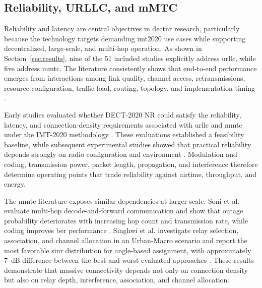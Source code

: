 \subsection{Reliability, URLLC, and mMTC}
\label{subsec:reliability}

Reliability and latency are central objectives in \gls{dectnr} research, particularly because the technology targets demanding \gls{imt2020} use cases while supporting decentralized, large-scale, and multi-hop operation. As shown in Section~\ref{sec:results}, nine of the 51 included studies explicitly address \gls{urllc}, while five address \gls{mmtc}. The literature consistently shows that end-to-end performance emerges from interactions among link quality, channel access, retransmissions, resource configuration, traffic load, routing, topology, and implementation timing \cite{maliatsosEvaluationIMT2020Candidate2022a, smidaETSIDECT2020Component2023, samuylovEmpoweringNearURLLCIoT2025}.

Early studies evaluated whether DECT-2020 NR could satisfy the reliability, latency, and connection-density requirements associated with \gls{urllc} and \gls{mmtc} under the IMT-2020 methodology \cite{maliatsosEvaluationIMT2020Candidate2022a, smidaETSIDECT2020Component2023, pennerURLLCPerformanceEvaluation2021}. These evaluations established a feasibility baseline, while subsequent experimental studies showed that practical reliability depends strongly on radio configuration and environment \cite{haqueDECT2020NRLink2025, bandaraExperimentalValidationAnalysis2025, grafParetoOptimalityApproach2026a}. Modulation and coding, transmission power, packet length, propagation, and interference therefore determine operating points that trade reliability against airtime, throughput, and energy.

The \gls{mmtc} literature exposes similar dependencies at larger scale. Soni et al. evaluate multi-hop decode-and-forward communication and show that outage probability deteriorates with increasing hop count and transmission rate, while coding improves \gls{ber} performance \cite{soniPerformanceMultihopAssisted2021}. Singhwi et al. investigate relay selection, association, and channel allocation in an Urban-Macro scenario and report the most favorable \gls{sinr} distribution for angle-based assignment, with approximately 7~dB difference between the best and worst evaluated approaches \cite{singhwiDECT2020NewRadio2021}. These results demonstrate that massive connectivity depends not only on connection density but also on relay depth, interference, association, and channel allocation.

